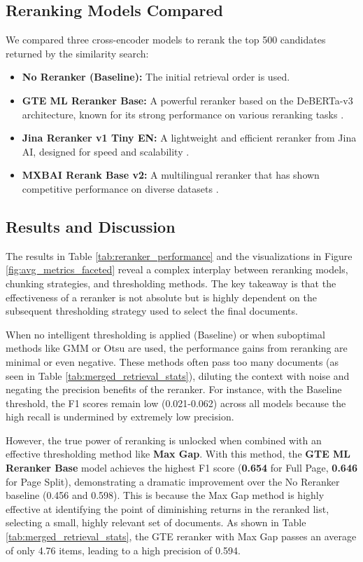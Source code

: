 \subsection{Reranking Models Compared}
We compared three cross-encoder models to rerank the top 500 candidates returned by the similarity search:
\begin{itemize}
    \item \textbf{No Reranker (Baseline):} The initial retrieval order is used.
    \item \textbf{GTE ML Reranker Base:} A powerful reranker based on the DeBERTa-v3 architecture, known for its strong performance on various reranking tasks \autocite{li2024generative}.
    \item \textbf{Jina Reranker v1 Tiny EN:} A lightweight and efficient reranker from Jina AI, designed for speed and scalability \autocite{jina-reranker-v1-tiny-en}.
    \item \textbf{MXBAI Rerank Base v2:} A multilingual reranker that has shown competitive performance on diverse datasets \autocite{pradeep2024reranking}.
\end{itemize}

\subsection{Results and Discussion}

The results in Table \ref{tab:reranker_performance} and the visualizations in Figure \ref{fig:avg_metrics_faceted} reveal a complex interplay between reranking models, chunking strategies, and thresholding methods. The key takeaway is that the effectiveness of a reranker is not absolute but is highly dependent on the subsequent thresholding strategy used to select the final documents.

When no intelligent thresholding is applied (Baseline) or when suboptimal methods like GMM or Otsu are used, the performance gains from reranking are minimal or even negative. These methods often pass too many documents (as seen in Table \ref{tab:merged_retrieval_stats}), diluting the context with noise and negating the precision benefits of the reranker. For instance, with the Baseline threshold, the F1 scores remain low (0.021-0.062) across all models because the high recall is undermined by extremely low precision.

However, the true power of reranking is unlocked when combined with an effective thresholding method like \textbf{Max Gap}. With this method, the \textbf{GTE ML Reranker Base} model achieves the highest F1 score (\textbf{0.654} for Full Page, \textbf{0.646} for Page Split), demonstrating a dramatic improvement over the No Reranker baseline (0.456 and 0.598). This is because the Max Gap method is highly effective at identifying the point of diminishing returns in the reranked list, selecting a small, highly relevant set of documents. As shown in Table \ref{tab:merged_retrieval_stats}, the GTE reranker with Max Gap passes an average of only 4.76 items, leading to a high precision of 0.594.

